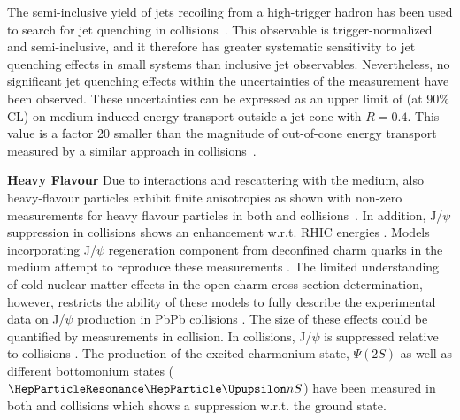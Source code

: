 \documentclass[../report.tex]{subfiles}
\begin{document}
The semi-inclusive yield of jets recoiling from a high-\pT trigger hadron has been used to search for jet quenching in \pPb collisions~\cite{Acharya:2017okq}. This observable is trigger-normalized and semi-inclusive, and it therefore has greater systematic sensitivity to jet quenching effects in small systems than inclusive jet observables. Nevertheless, no significant jet quenching effects within the uncertainties of the measurement have been observed. These uncertainties can be expressed as an upper limit of \unit[400]{\UMeV} (at 90\% CL) on medium-induced energy transport outside a jet cone with $R=0.4$. This value is a factor 20 smaller than the magnitude of out-of-cone energy transport measured by a similar approach in \PbPb collisions~\cite{Adam:2015doa}.

\textbf{Heavy Flavour}
Due to interactions and rescattering with the medium, also heavy-flavour particles exhibit finite anisotropies as shown with non-zero \vtwo measurements for heavy flavour particles in both \PbPb and \pPb collisions~\cite{ALICE:2013xna,Abelev:2013lca,Abelev:2014ipa,Adam:2015pga,Acharya:2017tfn,Adam:2016ssk,ALICE:2016clc,Acharya:2017qps,Sirunyan:2017plt,Acharya:2017tgv,Khachatryan:2016ypw,Acharya:2018dxy,Sirunyan:2018toe}. In addition, J/$\psi$ suppression in \PbPb collisions shows an enhancement w.r.t. RHIC energies \cite{Adam:2015isa}. Models incorporating J/$\psi$ regeneration component from deconfined charm quarks in the medium attempt to reproduce these measurements \cite{Abelev:2012rv,Adam:2015isa}. The limited understanding of cold nuclear matter effects in the open charm cross section determination, however, restricts the ability of these models to fully describe the experimental data on J/$\psi$ production in PbPb collisions \cite{Aaij:2017cqq}. The size of these effects could be quantified by measurements in \pPb collision. In \pPb collisions, J/$\psi$ is suppressed relative to \pp collisions \cite{Aaij:2017cqq}. The production of the excited charmonium state, $\Psi(2S)$ as well as different bottomonium states ($\PGUP{nS}$) have been measured in both \PbPb and \pPb collisions \cite{Adam:2016ohd,Adam:2015isa,Aaboud:2017cif,Sirunyan:2016znt,Khachatryan:2016xxp} which shows a suppression w.r.t. the ground state. 
\end{document}
